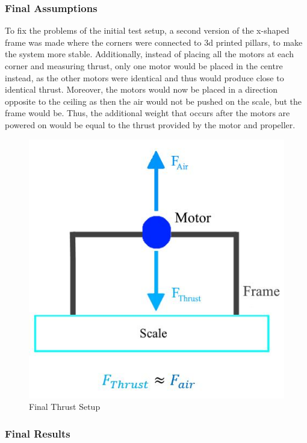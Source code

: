 \subsubsection{Final Assumptions}
To fix the problems of the initial test setup, a second version of the x-shaped frame was made where the corners were connected to 3d printed pillars, 
to make the system more stable. Additionally, instead of placing all the motors at each corner and measuring thrust, only one motor would be placed in the centre instead, 
as the other motors were identical and thus would produce close to identical thrust. Moreover, the motors would now be placed in a direction opposite to the ceiling as then the air would not be pushed on the scale, 
but the frame would be. Thus, the additional weight that occurs after the motors are powered on would be equal to the thrust provided by the motor and propeller.

\begin{figure}
    \includegraphics[width=\linewidth]{pictures/control/Motor thrust 2.jpg}
    \caption{Final Thrust Setup}
    \label{fig:Final Thrust Setup}

\end{figure}

\subsubsection{Final Results}

